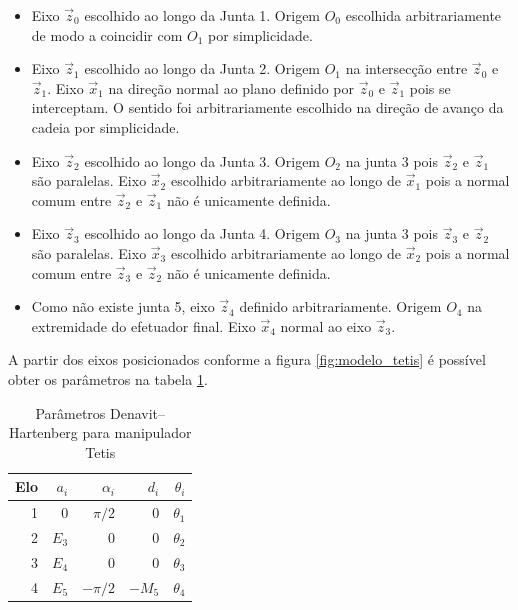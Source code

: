 \begin{itemize}
\item Eixo $\vec{z}_0$ escolhido ao longo da Junta 1. Origem $O_0$ escolhida arbitrariamente de modo a coincidir com $O_1$ por simplicidade.  
\item Eixo $\vec{z}_1$ escolhido ao longo da Junta 2. Origem $O_1$ na intersecção entre $\vec{z}_0$ e $\vec{z}_1$. Eixo $\vec{x}_1$ na direção normal ao plano definido por $\vec{z}_0$ e $\vec{z}_1$ pois se interceptam. O sentido foi arbitrariamente escolhido na direção de avanço da cadeia por simplicidade.
\item Eixo $\vec{z}_2$ escolhido ao longo da Junta 3. Origem $O_2$ na junta 3 pois $\vec{z}_2$ e $\vec{z}_1$ são paralelas. Eixo $\vec{x}_2$ escolhido arbitrariamente ao longo de $\vec{x}_1$ pois a normal comum entre $\vec{z}_2$ e $\vec{z}_1$ não é unicamente definida.
\item Eixo $\vec{z}_3$ escolhido ao longo da Junta 4. Origem $O_3$ na junta 3 pois $\vec{z}_3$ e $\vec{z}_2$ são paralelas. Eixo $\vec{x}_3$ escolhido arbitrariamente ao longo de  $\vec{x}_2$ pois a normal comum entre $\vec{z}_3$ e $\vec{z}_2$ não é unicamente definida.
\item Como não existe junta 5, eixo $\vec{z}_4$ definido arbitrariamente. Origem $O_4$ na extremidade do efetuador final. Eixo $\vec{x}_4$ normal ao eixo $\vec{z}_3$.
\end{itemize}

A partir dos eixos posicionados conforme a figura \ref{fig:modelo_tetis} é possível obter os parâmetros na tabela \ref{tab:dh_tetis}. 


\begin{table}[h!]
\centering
\caption{Parâmetros Denavit–Hartenberg para manipulador Tetis}
\label{tab:dh_tetis}
\begin{tabular}{rrrrr} \hline
Elo & $a_i$ & $\alpha_i$ & $d_i$  & $\theta_i$ \\ \hline
1   & 0     & $\pi/2$    & 0      & $\theta_1$ \\
2   & $E_3$ & 0          & 0      & $\theta_2$ \\
3   & $E_4$ & 0          & 0      & $\theta_3$ \\
4   & $E_5$ & $-\pi/2$   & $-M_5$ & $\theta_4$ \\ \hline
\end{tabular}
\end{table}


